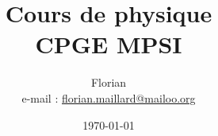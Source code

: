 \documentclass[11pt,a4paper]{book}
\title{\textbf{\Huge Cours de physique \\ CPGE MPSI}}
\author{Florian \bsc{Maillard}\\ e-mail : \href{mailto:florian.maillard@mailoo.org}{florian.maillard@mailoo.org}}
\date{\today}
\begin{document}
\frontmatter

\maketitle
\dominitoc
\dominilof
\dominilot

\mainmatter


































%
\backmatter
\tableofcontents
\printindex
\end{document}
